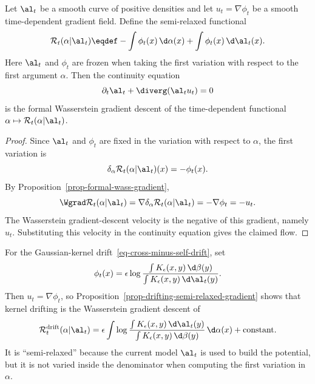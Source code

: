 \begin{prop}\label{prop-drifting-semi-relaxed-gradient}
	Let $\al_t$ be a smooth curve of positive densities and let $u_t=\nabla\phi_t$ be a smooth time-dependent gradient field. Define the semi-relaxed functional
	\begin{equation}\label{eq-semi-relaxed-drift-functional}
		\mathcal R_t(\alpha|\al_t)
		\eqdef
		-\int \phi_t(x)\,\d\alpha(x)
		+\int \phi_t(x)\,\d\al_t(x).
	\end{equation}
	Here $\al_t$ and $\phi_t$ are frozen when taking the first variation with respect to the first argument $\alpha$. Then the continuity equation
	\[
		\partial_t\al_t+\diverg(\al_t u_t)=0
	\]
	is the formal Wasserstein gradient descent of the time-dependent functional $\alpha\mapsto\mathcal R_t(\alpha|\al_t)$.
\end{prop}

\begin{proof}
	Since $\al_t$ and $\phi_t$ are fixed in the variation with respect to $\alpha$, the first variation is
	\[
		\delta_\alpha \mathcal R_t(\alpha|\al_t)(x)=-\phi_t(x).
	\]
	By Proposition~\ref{prop-formal-wass-gradient},
	\[
		\Wgrad \mathcal R_t(\alpha|\al_t)
		=
		\nabla\delta_\alpha \mathcal R_t(\alpha|\al_t)
		=
		-\nabla\phi_t
		=
		-u_t.
	\]
	The Wasserstein gradient-descent velocity is the negative of this gradient, namely $u_t$. Substituting this velocity in the continuity equation gives the claimed flow.
\end{proof}

\begin{example}
	For the Gaussian-kernel drift~\eqref{eq-cross-minus-self-drift}, set
	\[
		\phi_t(x)=
		\epsilon\log
		\frac{\int K_\epsilon(x,y)\,\d\beta(y)}
		     {\int K_\epsilon(x,y)\,\d\al_t(y)}.
	\]
	Then $u_t=\nabla\phi_t$, so Proposition~\ref{prop-drifting-semi-relaxed-gradient} shows that kernel drifting is the Wasserstein gradient descent of
	\[
		\mathcal R_t^{\mathrm{drift}}(\alpha|\al_t)
		=
		\epsilon
		\int
		\log
		\frac{\int K_\epsilon(x,y)\,\d\al_t(y)}
		     {\int K_\epsilon(x,y)\,\d\beta(y)}
		\,\d\alpha(x)
		+\mathrm{constant}.
	\]
	It is ``semi-relaxed'' because the current model $\al_t$ is used to build the potential, but it is not varied inside the denominator when computing the first variation in $\alpha$.
\end{example}

